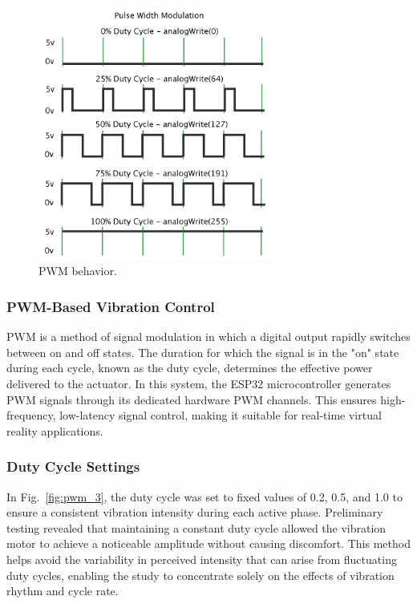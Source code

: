 \begin{figure}[H]\centering
	\includegraphics[width=0.7\textwidth]{Pictures/PWM_2.png}%
	\caption{PWM behavior.~\cite{pwm_doc}}\label{fig:pwm_2}%
	
\end{figure}

\subsubsection{PWM-Based Vibration Control}
PWM is a method of signal modulation in which a digital output rapidly switches between on and off states. The duration for which the signal is in the "on" state during each cycle, known as the duty cycle, determines the effective power delivered to the actuator. In this system, the ESP32 microcontroller generates PWM signals through its dedicated hardware PWM channels. This ensures high-frequency, low-latency signal control, making it suitable for real-time virtual reality applications.

\newpage
\subsubsection{Duty Cycle Settings}
In Fig.~\ref{fig:pwm_3}, the duty cycle was set to fixed values of 0.2, 0.5, and 1.0 to ensure a consistent vibration intensity during each active phase. Preliminary testing revealed that maintaining a constant duty cycle allowed the vibration motor to achieve a noticeable amplitude without causing discomfort. This method helps avoid the variability in perceived intensity that can arise from fluctuating duty cycles, enabling the study to concentrate solely on the effects of vibration rhythm and cycle rate.

